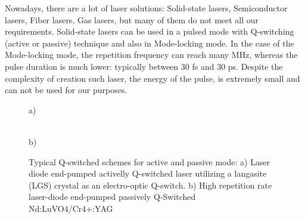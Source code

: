 Nowadays, there are a lot of laser solutions: Solid-state lasers, Semiconductor lasers, Fiber lasers, Gas lasers, but many of them do not meet all our requirements.
Solid-state lasers can be used in a pulsed mode with Q-switching (active or passive) technique and also in Mode-locking mode. In the case of the Mode-locking mode, the repetition frequency can reach many MHz, whereas the pulse duration is much lower: typically between 30 fs and 30 ps. Despite the complexity of creation such laser, the energy of the pulse, is extremely small and can not be used for our purposes.


\begin{figure}[H]
\begin{minipage}[h]{0.52\linewidth}
 a) \\
\end{minipage}
\hfill
\begin{minipage}[h]{0.45\linewidth}
 \\b)
\end{minipage}


\caption{Typical Q-switched schemes for active and passive mode:
a) Laser diode end-pumped activelly Q-switched laser utilizing a langasite (LGS) crystal as an electro-optic Q-switch.
b) High repetition rate laser-diode end-pumped passively Q-Switched Nd:LuVO4/Cr4+:YAG
}
\label{fig:qs_lasers}
\end{figure}

